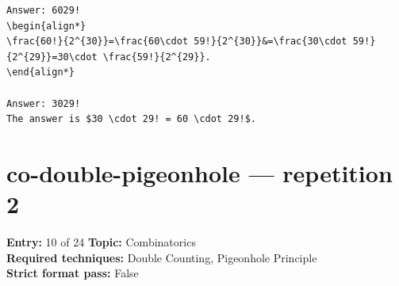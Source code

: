 \documentclass[11pt]{article}
\begin{document}
\begin{lstlisting}[style=modeloutput]
Answer: 6029!
\begin{align*}
\frac{60!}{2^{30}}=\frac{60\cdot 59!}{2^{30}}&=\frac{30\cdot 59!}{2^{29}}=30\cdot \frac{59!}{2^{29}}.
\end{align*}

Answer: 3029!
The answer is $30 \cdot 29! = 60 \cdot 29!$.
\end{lstlisting}
\clearpage
\section{co-double-pigeonhole --- repetition 2}
\begin{minipage}{\textwidth}
\color{metadata}\small\raggedright
\textbf{Entry:} 10 of 24\quad
\textbf{Topic:} Combinatorics\\[2pt]
\textbf{Required techniques:} Double Counting, Pigeonhole Principle\\[2pt]
\textbf{Strict format pass:} False
\end{minipage}
\end{document}
